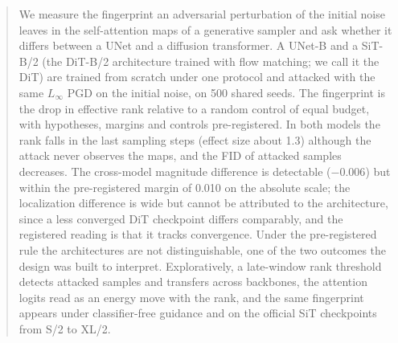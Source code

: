 \documentclass{article}
\begin{document}


\begin{abstract}
We measure the fingerprint an adversarial perturbation of the initial noise leaves in the self-attention maps of a generative sampler and ask whether it differs between a UNet and a diffusion transformer. A UNet-B and a SiT-B/2 (the DiT-B/2 architecture trained with flow matching; we call it the DiT) are trained from scratch under one protocol and attacked with the same $L_\infty$ PGD on the initial noise, on 500 shared seeds. The fingerprint is the drop in effective rank relative to a random control of equal budget, with hypotheses, margins and controls pre-registered. In both models the rank falls in the last sampling steps (effect size about 1.3) although the attack never observes the maps, and the FID of attacked samples decreases. The cross-model magnitude difference is detectable ($-0.006$) but within the pre-registered margin of 0.010 on the absolute scale; the localization difference is wide but cannot be attributed to the architecture, since a less converged DiT checkpoint differs comparably, and the registered reading is that it tracks convergence. Under the pre-registered rule the architectures are not distinguishable, one of the two outcomes the design was built to interpret. Exploratively, a late-window rank threshold detects attacked samples and transfers across backbones, the attention logits read as an energy move with the rank, and the same fingerprint appears under classifier-free guidance and on the official SiT checkpoints from S/2 to XL/2.
\end{abstract}

\end{document}
